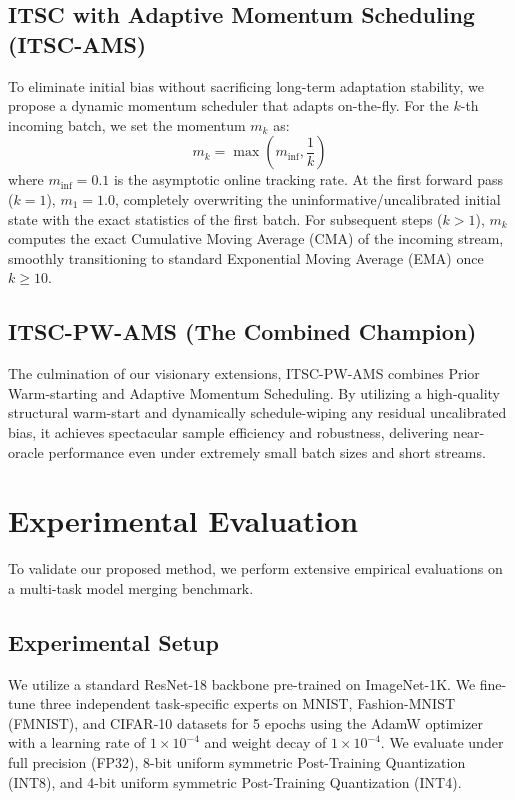 \documentclass{article}
\theoremstyle{plain}
\theoremstyle{definition}
\theoremstyle{remark}
\begin{document}
\subsection{ITSC with Adaptive Momentum Scheduling (ITSC-AMS)}
To eliminate initial bias without sacrificing long-term adaptation stability, we propose a dynamic momentum scheduler that adapts on-the-fly. For the $k$-th incoming batch, we set the momentum $m_k$ as:
\begin{equation}
  m_k = \max \left( m_{\text{inf}}, \frac{1}{k} \right)
\end{equation}
where $m_{\text{inf}} = 0.1$ is the asymptotic online tracking rate. At the first forward pass ($k=1$), $m_1 = 1.0$, completely overwriting the uninformative/uncalibrated initial state with the exact statistics of the first batch. For subsequent steps ($k > 1$), $m_k$ computes the exact Cumulative Moving Average (CMA) of the incoming stream, smoothly transitioning to standard Exponential Moving Average (EMA) once $k \ge 10$.

\subsection{ITSC-PW-AMS (The Combined Champion)}
The culmination of our visionary extensions, ITSC-PW-AMS combines Prior Warm-starting and Adaptive Momentum Scheduling. By utilizing a high-quality structural warm-start and dynamically schedule-wiping any residual uncalibrated bias, it achieves spectacular sample efficiency and robustness, delivering near-oracle performance even under extremely small batch sizes and short streams.

\section{Experimental Evaluation}
\label{sec:experiments}

To validate our proposed method, we perform extensive empirical evaluations on a multi-task model merging benchmark.

\subsection{Experimental Setup}
We utilize a standard ResNet-18 backbone pre-trained on ImageNet-1K. We fine-tune three independent task-specific experts on MNIST, Fashion-MNIST (FMNIST), and CIFAR-10 datasets for 5 epochs using the AdamW optimizer with a learning rate of $1 \times 10^{-4}$ and weight decay of $1 \times 10^{-4}$. We evaluate under full precision (FP32), 8-bit uniform symmetric Post-Training Quantization (INT8), and 4-bit uniform symmetric Post-Training Quantization (INT4). 
\end{document}
